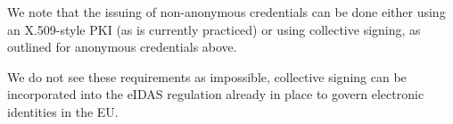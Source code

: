 We note that the issuing of non-anonymous credentials can be done either using 
an X.509-style \ac{PKI} (as is currently practiced) or using collective 
signing, as outlined for anonymous credentials above.

We do not see these requirements as impossible, \eg collective signing can be 
incorporated into the eIDAS regulation already in place to govern electronic 
identities in the EU.
